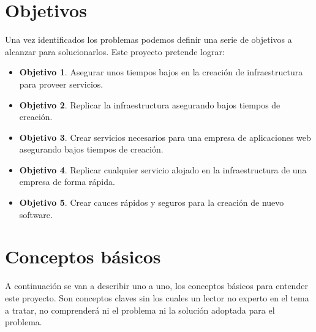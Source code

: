\section{Objetivos}
\label{objetivos_primarios}
\begin{text}
	Una vez identificados los problemas podemos definir una serie de objetivos a alcanzar para solucionarlos. Este proyecto pretende lograr:
	\begin{itemize}
		\item \textbf{Objetivo 1}. Asegurar unos tiempos bajos en la creación de infraestructura para proveer servicios.
		\item \textbf{Objetivo 2}. Replicar la infraestructura asegurando bajos tiempos de creación.
		\item \textbf{Objetivo 3}. Crear servicios necesarios para una empresa de aplicaciones web asegurando bajos tiempos de creación.
		\item \textbf{Objetivo 4}. Replicar cualquier servicio alojado en la infraestructura de una empresa de forma rápida.
		\item \textbf{Objetivo 5}. Crear cauces rápidos y seguros para la creación de nuevo software.
	\end{itemize}
\end{text}

\section{Conceptos básicos}
		\begin{text}
			A continuación se van a describir uno a uno, los conceptos básicos para entender este proyecto. Son conceptos claves sin los cuales un lector no experto en el tema a tratar, no comprenderá ni el problema ni la solución adoptada para el problema.
		\end{text}

